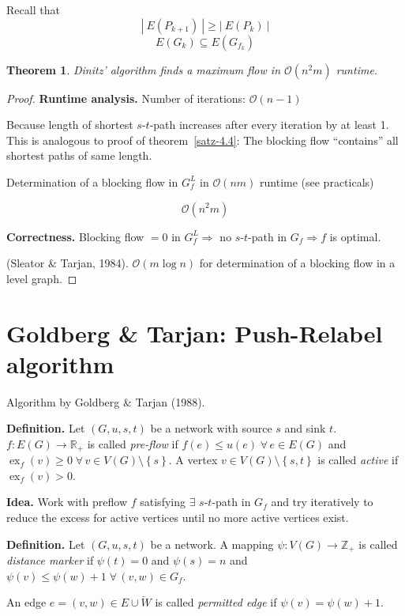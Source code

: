 \documentclass{article}
\newtheorem{theorem}{Theorem}
\newcommand{\card}[1]{\left|\:\!#1\:\!\right|}
\newcommand{\set}[1]{\left\{#1\right\}}
\newcommand{\gath}[2]{$#1$-$#2$-path} %
\newcommand{\fall}{\;\forall\,}
\begin{document}
Recall that
  \[ \card{E(P_{k+1})} \geq \card{E(P_k)} \]
  \[ E(G_k) \subseteq E(G_{f_k}) \]

\begin{theorem}\label{satz-4.6}
  Dinitz' algorithm finds a maximum flow in $\mathcal{O}(n^2m)$ runtime.
\end{theorem}

\begin{proof}
  \textbf{Runtime analysis.}
  Number of iterations: $\mathcal{O}(n-1)$

  Because length of shortest \gath st increases after every iteration by at least 1.
  This is analogous to proof of theorem~\ref{satz-4.4}: The blocking flow ``contains'' all
  shortest paths of same length.

  Determination of a blocking flow in $G^L_f$ in $\mathcal{O}(nm)$ runtime (see practicals)

  \[
    \mathcal{O}(n^2 m)
  \]

  \textbf{Correctness.}
  Blocking flow $=0$ in $G^L_f \Rightarrow$ no \gath st in $G_f \Rightarrow f$ is optimal.

  (Sleator \& Tarjan, 1984).
    $\mathcal{O}(m \log{n})$ for determination of a blocking flow in a level graph.
\end{proof}

\section{Goldberg \& Tarjan: Push-Relabel algorithm}
%
Algorithm by Goldberg \& Tarjan (1988).

\textbf{Definition.}
  Let $(G, u, s, t)$ be a network with source $s$ and sink $t$.
  $f: E(G) \rightarrow \mathbb{R}_+$ is called \emph{pre-flow} if $f(e) \leq u(e) \fall e \in E(G)$
  and $\operatorname{ex}_f(v) \geq 0 \fall v \in V(G) \setminus \set{s}$.
  A vertex $v \in V(G) \setminus \set{s, t}$ is called \emph{active} if $\operatorname{ex}_f(v) > 0$.

\textbf{Idea.}
  Work with preflow $f$ satisfying $\exists$ \gath st in $G_f$ and try iteratively to reduce the excess for active vertices until no more active vertices exist.

\textbf{Definition.}
  Let $(G, u, s, t)$ be a network. A mapping $\psi: V(G) \rightarrow \mathbb{Z}_+$ is called \emph{distance marker} if $\psi(t) = 0$ and $\psi(s) = n$ and $\psi(v) \leq \psi(w) + 1 \fall (v, w) \in G_f$.

An edge $e = (v, w) \in E \cup \overleftarrow{W}$ is called \emph{permitted edge} if $\psi(v) = \psi(w) + 1$.
\end{document}
